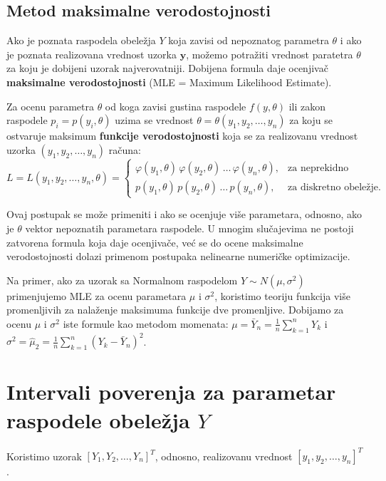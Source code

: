\documentclass[twoside,titlepage,12pt,a4paper]{book}
\numberwithin{equation}{chapter}
\begin{document}
\subsection{Metod maksimalne verodostojnosti}

Ako je poznata raspodela obeležja $Y$ koja zavisi od nepoznatog parametra $\theta$ i ako je poznata realizovana vrednost uzorka $\mathbf{y}$, možemo potražiti vrednost paratetra $\theta$ za koju je dobijeni uzorak najverovatniji. Dobijena formula daje ocenjivač \textbf{maksimalne verodostojnosti} (MLE = Maximum Likelihood Estimate).

Za ocenu parametra $\theta$ od koga zavisi gustina raspodele $f ( y, \theta )$ ili zakon raspodele $p_i = p ( y_i, \theta )$ uzima se vrednost $\theta = \theta ( y_1, y_2, \ldots, y_n )$ za koju se ostvaruje maksimum \textbf{funkcije verodostojnosti} koja se za realizovanu vrednost uzorka $( y_1, y_2, \ldots, y_n)$ računa:\\[3pt]
\[
L = L ( y_1, y_2, \ldots, y_n, \theta ) = 
\left\{ 
\begin{array}{rl}
\varphi ( y_1, \theta ) \, \varphi ( y_2, \theta ) \, \ldots \, \varphi ( y_n, \theta ), & \mbox{za neprekidno}\\
p ( y_1, \theta ) \, p ( y_2, \theta ) \, \ldots \, p ( y_n, \theta ), & \mbox{za diskretno obeležje.}
\end{array}
\right.
\]

Ovaj postupak se može primeniti i ako se ocenjuje više parametara, odnosno, ako je $\theta$ vektor nepoznatih parametara raspodele. U mnogim slučajevima ne postoji zatvorena formula koja daje ocenjivače, već se do ocene maksimalne verodostojnosti dolazi primenom postupaka nelinearne numeričke optimizacije.

Na primer, ako za uzorak sa Normalnom raspodelom $Y \sim N ( \mu, \sigma^2 )$ primenjujemo MLE za ocenu parametara $\mu$ i $\sigma^2$, koristimo teoriju funkcija više promenljivih za nalaženje maksimuma funkcije dve promenljive.
Dobijamo za ocenu $\mu$ i $\sigma^2$ iste formule kao metodom momenata:
$\mu = \bar{Y}_n = \frac1n \sum_{k=1}^n Y_k$ i $\sigma^2 = \hat{\mu}_2 = \frac1n \sum_{k=1}^n ( Y_k - \bar{Y}_n )^2$.

\section{Intervali poverenja za parametar raspodele obeležja $Y$}

Koristimo uzorak $[Y_1, Y_2, \ldots, Y_n]^T$, odnosno, realizovanu vrednost $[y_1, y_2, \ldots, y_n]^T$.
\end{document}
